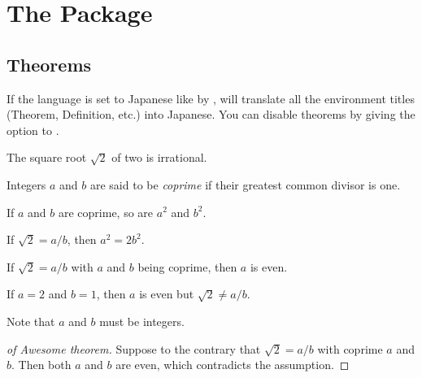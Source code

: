 \documentclass[11pt, a4paper]{article}
\begin{document}
\section{The  Package}
\subsection{Theorems}

If the language is set to Japanese like by ,  will translate all the environment titles (Theorem, Definition, etc.) into Japanese.
You can disable theorems by giving the option  to .

\begin{cnltxexample}
  \begin{theorem}
    The square root $\sqrt{2}$ of two is irrational.
  \end{theorem}

  \begin{definition}[Coprime]
    Integers $a$ and $b$ are said to be \emph{coprime} if their greatest common divisor is one.
  \end{definition}

  \begin{lemma}
    If $a$ and $b$ are coprime, so are $a^2$ and $b^2$.
  \end{lemma}

  \begin{proposition}
    If $\sqrt{2} = a/b$, then $a^2 = 2b^2$.
  \end{proposition}

  \begin{corollary}
    If $\sqrt{2} = a/b$ with $a$ and $b$ being coprime, then $a$ is even.
  \end{corollary}

  \begin{example}
    If $a = 2$ and $b = 1$, then $a$ is even but $\sqrt{2} \ne a/b$.
  \end{example}

  \begin{remark}
    Note that $a$ and $b$ must be integers.
  \end{remark}

  \begin{proof}[of Awesome theorem]
    Suppose to the contrary that $\sqrt{2} = a/b$ with coprime $a$ and $b$.
    Then both $a$ and $b$ are even, which contradicts the assumption.
  \end{proof}
\end{cnltxexample}
\end{document}
